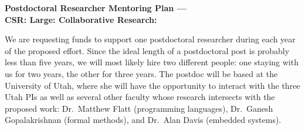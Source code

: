 \begin{center}
{\Large\sf\textbf{Postdoctoral Researcher Mentoring Plan ---\\
CSR: Large: Collaborative Research: \proptitle{}}}
\end{center}

%
%
%
%


We are requesting funds to support one postdoctoral researcher during
each year of the proposed effort.
%
Since the ideal length of a postdoctoral post is probably less than
five years, we will most likely hire two different people: one
staying with us for two years, the other for three years.
%
The postdoc will be based at the University of Utah, where she will
have the opportunity to interact with the three Utah PIs as well as
several other faculty whose research intersects with the proposed
work: Dr.~Matthew Flatt (programming languages), Dr.~Ganesh
Gopalakrishnan (formal methods), and Dr.~Alan Davis (embedded
systems).


